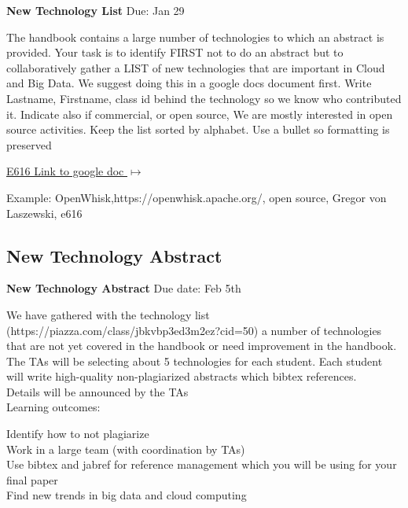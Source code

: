 \begin{exercise} \label{a:e6161-new-tech-list}

{\bf New Technology List} Due: Jan 29 

The handbook contains a large number of technologies to which an abstract is provided. Your task is to identify FIRST not to do an abstract but to collaboratively gather a LIST of new technologies that are important in Cloud and Big Data. We suggest doing this in a google docs document first. Write Lastname, Firstname, class id behind the technology so we know who contributed it. Indicate also if commercial, or open source, We are mostly interested in open source activities. Keep the list sorted by alphabet. Use a bullet so formatting is preserved

 
{\hfill \href{https://docs.google.com/document/d/1LeHGHTSBbaPXYVor0efhmi5W7JJjS7EQHABHqgRAPuU/edit?usp=sharing}{E616 Link to google doc $\mapsto$}}
 
Example: OpenWhisk,https://openwhisk.apache.org/, open source, Gregor von Laszewski, e616
 
\end{exercise}


\subsection{New Technology Abstract}

\begin{exercise}\label{a:e6161-new-tech-abstracts}
 
{\bf New Technology Abstract} Due date: Feb 5th

We have gathered with the technology list (https://piazza.com/class/jbkvbp3ed3m2ez?cid=50) a number of technologies that are not yet covered in the handbook or need improvement in the handbook.\\

The TAs will be selecting about 5 technologies for each student. Each student will write high-quality non-plagiarized abstracts which bibtex references.\\
 
Details will be announced by the TAs\\
 
Learning outcomes:

\noindent Identify how to not plagiarize\\
Work in a large team (with coordination by TAs)\\
Use bibtex and jabref for reference management which you will be using for your final paper\\
Find new trends in big data and cloud computing\\

\end{exercise}
